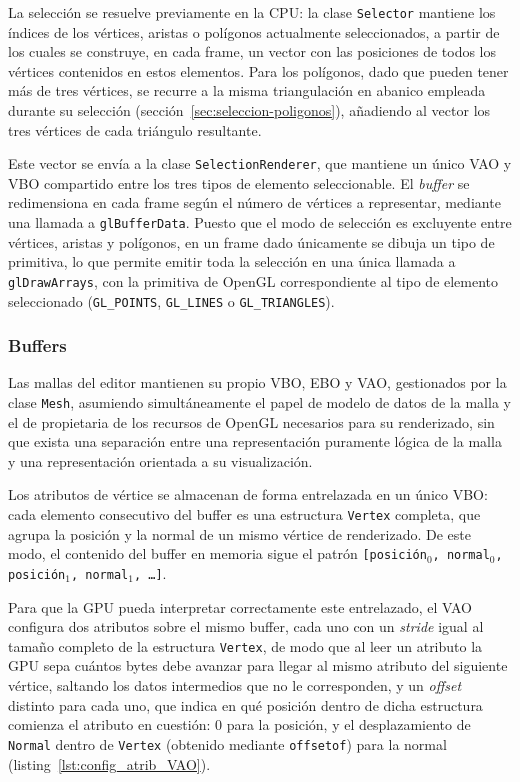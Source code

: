 La selección se resuelve previamente en la CPU: la clase \texttt{Selector} mantiene los índices de los vértices, aristas o polígonos actualmente seleccionados, a partir de los cuales se construye, en cada frame, un vector con las posiciones de todos los vértices contenidos en estos elementos. Para los polígonos, dado que pueden tener más de tres vértices, se recurre a la misma triangulación en abanico empleada durante su selección (sección~\ref{sec:seleccion-poligonos}), añadiendo al vector los tres vértices de cada triángulo resultante.

Este vector se envía a la clase \texttt{SelectionRenderer}, que mantiene un único VAO y VBO compartido entre los tres tipos de elemento seleccionable. El \textit{buffer} se redimensiona en cada frame según el número de vértices a representar, mediante una llamada a \texttt{glBufferData}. Puesto que el modo de selección es excluyente entre vértices, aristas y polígonos, en un frame dado únicamente se dibuja un tipo de primitiva, lo que permite emitir toda la selección en una única llamada a \texttt{glDrawArrays}, con la primitiva de OpenGL correspondiente al tipo de elemento seleccionado (\texttt{GL\_POINTS}, \texttt{GL\_LINES} o \texttt{GL\_TRIANGLES}).

\subsubsection{Buffers} \label{sec:buffers}

Las mallas del editor mantienen su propio VBO, EBO y VAO, gestionados por la clase \texttt{Mesh}, asumiendo simultáneamente el papel de modelo de datos de la malla y el de propietaria de los recursos de OpenGL necesarios para su renderizado, sin que exista una separación entre una representación puramente lógica de la malla y una representación orientada a su visualización.

Los atributos de vértice se almacenan de forma entrelazada en un único VBO: cada elemento consecutivo del buffer es una estructura \texttt{Vertex} completa, que agrupa la posición y la normal de un mismo vértice de renderizado. De este modo, el contenido del buffer en memoria sigue el patrón \texttt{[posición$_0$, normal$_0$, posición$_1$, normal$_1$, \ldots]}.

Para que la GPU pueda interpretar correctamente este entrelazado, el VAO configura dos atributos sobre el mismo buffer, cada uno con un \emph{stride} igual al tamaño completo de la estructura \texttt{Vertex}, de modo que al leer un atributo la GPU sepa cuántos bytes debe avanzar para llegar al mismo atributo del siguiente vértice, saltando los datos intermedios que no le corresponden, y un \emph{offset} distinto para cada uno, que indica en qué posición dentro de dicha estructura comienza el atributo en cuestión: 0 para la posición, y el desplazamiento de \texttt{Normal} dentro de \texttt{Vertex} (obtenido mediante \texttt{offsetof}) para la normal (listing~\ref{lst:config_atrib_VAO}).

